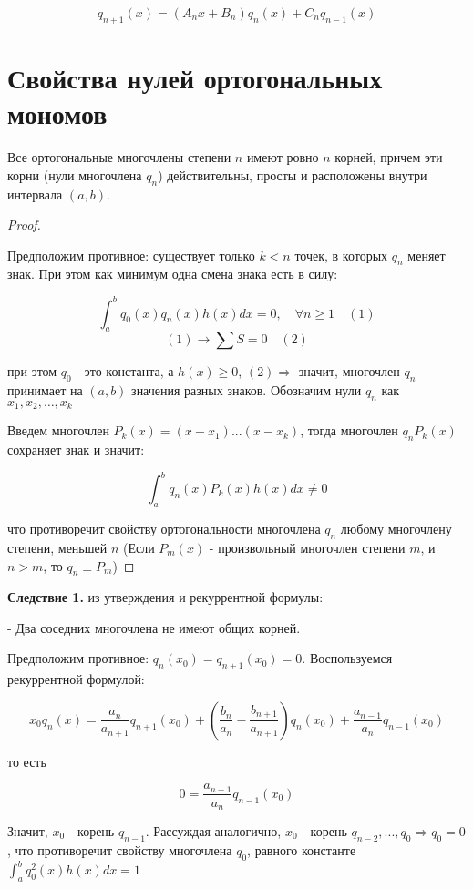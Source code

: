 \documentclass[12pt, a4paper]{report}
\begin{document}
\[ q_{n+1 }(x )= (A_n x + B_n ) q_n (x ) + C_nq_{n-1 } ( x) \] 

\section{Свойства нулей ортогональных мономов}

\begin{proposition}
    Все ортогональные многочлены степени \( n  \) имеют ровно \( n  \)  корней, причем эти корни (нули многочлена \( q_n \)) действительны, просты и расположены внутри интервала \( (a, b) .\) 
\end{proposition}

\begin{proof}
    \[  \] 
    
    Предположим противное: существует только \( k<n  \) точек, в которых \( q_n  \) меняет знак. При этом как минимум одна смена знака есть в силу: 

    \[ \int_{a }^{b } q_0 (x ) q_n (x ) h(x )dx = 0 ,\quad  \forall  n \ge 1 \quad  (1 ) \]
    \[ (1 ) \to  \sum S = 0 \quad (2)\]  

    при этом \( q_0      \) - это константа, а \( h(x ) \ge 0  \),  \( (2 ) \Rightarrow \) значит, многочлен \( q_n \) принимает на \( (a,b) \) значения разных знаков. Обозначим нули \( q_n \)  как \( x_1 , x_2, \ldots, x_k \) 

    Введем многочлен \( P_k (x )= (x - x_1 )...(x- x_k) \), тогда многочлен \( q_n P_k(x ) \) сохраняет знак и значит: 

    \[ \int_{a }^{b } q_n(x ) P_k(x ) h(x )dx \neq 0  \] 

    что противоречит свойству ортогональности многочлена \( q_n \) любому многочлену степени, меньшей \( n \) (Если \( P_m(x) \) - произвольный многочлен степени \( m  \), и \( n>m \), то \( q_n \perp P_m \))
\end{proof}

\begin{flushleft}  
    \textbf{Следствие 1.} из утверждения и рекуррентной формулы: 

    - Два соседних многочлена не имеют общих корней. 

    Предположим противное: \( q_n (x_0)  = q_{n +1 } (x_0 ) = 0\). Воспользуемся рекуррентной формулой: 

    \[ x_0 q_n (x ) = \frac{a_n } {a_{n+1 } } q_{n+1 } (x_0) + \left(  \frac{b_n }{a_n } - \frac{b_{n +1 } }{a_{n +1 } }   \right) q_{n } (x_0 ) + \frac{a_{n - 1 } }{a_n }  q_{n -1 } (x_0) \] 

    то есть 

    \[ 0 = \frac{a_{n -1 } }{a_n } q_{n -1 } (x_0 )  \] 

    Значит, \( x_0  \)  - корень \( q_{n-1}  \). Рассуждая аналогично, \( x_0  \) - корень \( q_{n-2 } ,..., q_0  \Rightarrow q_0 = 0 \), что противоречит свойству многочлена \( q_0 \), равного константе \(\displaystyle  \int_{a }^{b } q_0 ^2 (x )h(x )dx =1  \) 
\end{flushleft}
\end{document}
